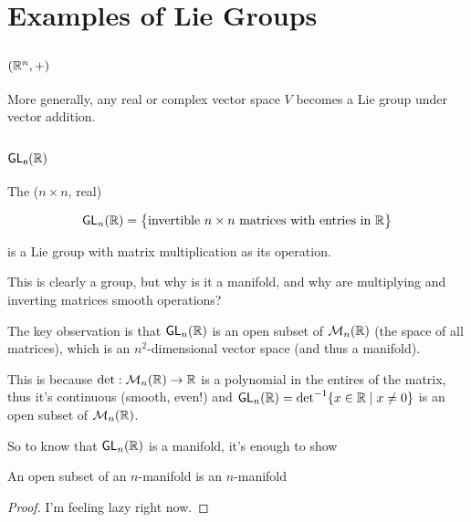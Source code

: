 \documentclass[../main.tex]{subfiles}
\begin{document}
\section{Examples of Lie Groups}

  
\subsection{$(\mathbb{R}^n, +)$}

More generally, any real or complex vector space $V$ becomes a Lie group 
under vector addition.

\subsection{$\mathsf{GL_n(\mathbb{R})}$}

\begin{defn}
  The ($n \times n$, real)  

  \[ \mathsf{GL}_n(\mathbb{R}) = \big \{ \text{invertible $n \times n$ matrices with entries in $\mathbb{R}$} \big \} \]

  is a Lie group with matrix multiplication as its operation.
\end{defn}

This is clearly a group, but why is it a manifold, and why are multiplying
and inverting matrices smooth operations?

The key observation is that $\mathsf{GL}_n(\mathbb{R})$ is an open subset of 
$\mathcal{M}_n(\mathbb{R})$ (the space of all matrices), which is an $n^2$-dimensional
vector space (and thus a manifold).

This is because $\text{det} : \mathcal{M}_n(\mathbb{R}) \to \mathbb{R}$ is a polynomial in
the entires of the matrix, thus it's continuous (smooth, even!) and 
$\mathsf{GL}_n(\mathbb{R}) = \text{det}^{-1} \{ x \in \mathbb{R} \mid x \neq 0 \}$ is an 
open subset of $\mathcal{M}_n(\mathbb{R})$.

So to know that $\mathsf{GL}_n(\mathbb{R})$ is a manifold, it's enough to show

\begin{thm}
  An open subset of an $n$-manifold is an $n$-manifold
\end{thm}

\begin{proof}
  I'm feeling lazy right now.

\end{proof}
\end{document}
